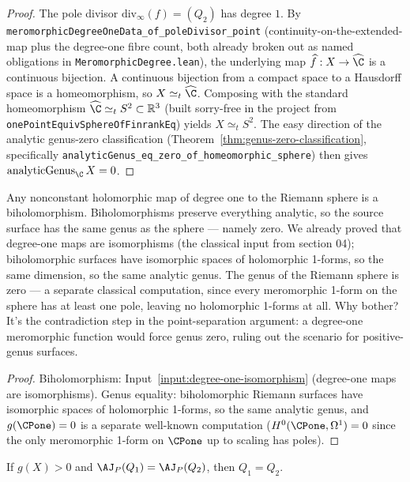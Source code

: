 \begin{proof}\leanok
The pole divisor \(\mathrm{div}_\infty(f) = (Q_2)\) has degree
\(1\). By
\texttt{meromorphicDegreeOneData\_of\_poleDivisor\_point}
(continuity-on-the-extended-map plus the degree-one fibre count, both
already broken out as named obligations in
\texttt{MeromorphicDegree.lean}), the underlying map
\(\widehat f : X \to \widehat{\C}\) is a continuous bijection. A
continuous bijection from a compact space to a Hausdorff space is a
homeomorphism, so \(X \simeq_t \widehat{\C}\). Composing with the
standard homeomorphism
\(\widehat{\C} \simeq_t S^2 \subset \mathbb R^3\) (built sorry-free
in the project from \texttt{onePointEquivSphereOfFinrankEq}) yields
\(X \simeq_t S^2\). The easy direction of the analytic genus-zero
classification (Theorem~\ref{thm:genus-zero-classification},
specifically
\texttt{analyticGenus\_eq\_zero\_of\_homeomorphic\_sphere}) then gives
\(\mathrm{analyticGenus}_\C\, X = 0\).
\end{proof}


\begin{layman}
Any nonconstant holomorphic map of degree one to the Riemann sphere is
a biholomorphism. Biholomorphisms preserve everything analytic, so the
source surface has the same genus as the sphere --- namely zero. We
already proved that degree-one maps are isomorphisms (the classical
input from section 04); biholomorphic surfaces have isomorphic spaces
of holomorphic 1-forms, so the same dimension, so the same analytic
genus. The genus of the Riemann sphere is zero --- a separate classical
computation, since every meromorphic 1-form on the sphere has at
least one pole, leaving no holomorphic 1-forms at all. Why
bother? It's the contradiction step in the point-separation argument:
a degree-one meromorphic function would force genus zero, ruling out
the scenario for positive-genus surfaces.
\end{layman}

\begin{proof}\leanok
Biholomorphism: Input~\ref{input:degree-one-isomorphism} (degree-one
maps are isomorphisms). Genus equality: biholomorphic Riemann surfaces
have isomorphic spaces of holomorphic 1-forms, so the same analytic
genus, and \(g(\CPone)=0\) is a separate well-known computation
(\(H^{0}(\CPone,\Omega^{1})=0\) since the only meromorphic 1-form on
\(\CPone\) up to scaling has poles).
\end{proof}

\begin{theorem}
\label{thm:abel-point-separation}
If \(g(X)>0\) and \(\AJ_P(Q_1)=\AJ_P(Q_2)\), then \(Q_1=Q_2\).
\leanok
\end{theorem}

